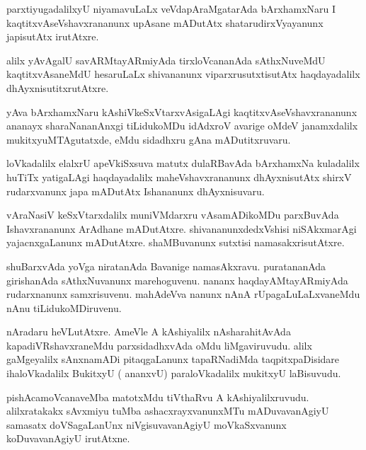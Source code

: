 \documentclass{article}
\begin{document}
\begin{mn}
parxtiyugadalilxyU niyamavuLaLx veVdapAraMgatarAda bArxhamxNaru I kaqtitxvAseVshavxrananunx 
upAsane mADutAtx shatarudirxVyayanunx japisutAtx irutAtxre.
\end{mn}

\begin{mn}
alilx yAvAgalU savARMtayARmiyAda tirxloVcananAda sAthxNuveMdU kaqtitxvAsaneMdU hesaruLaLx 
shivananunx viparxrusutxtisutAtx haqdayadalilx dhAyxnisutitxrutAtxre.
\end{mn}

\begin{mn}
yAva bArxhamxNaru kAshiVkeSxVtarxvAsigaLAgi kaqtitxvAseVshavxrananunx ananayx sharaNananAnxgi 
tiLidukoMDu idAdxroV avarige oMdeV janamxdalilx mukitxyuMTAgutatxde, eMdu sidadhxru gAna 
mADutitxruvaru.
\end{mn}

\begin{mn}
loVkadalilx elalxrU apeVkiSxsuva matutx dulaRBavAda bArxhamxNa kuladalilx huTiTx yatigaLAgi 
haqdayadalilx maheVshavxrananunx dhAyxnisutAtx shirxV rudarxvanunx japa mADutAtx Ishananunx 
dhAyxnisuvaru.
\end{mn}

\begin{mn}
vAraNasiV keSxVtarxdalilx muniVMdarxru vAsamADikoMDu parxBuvAda Ishavxrananunx ArAdhane mADutAtxre. 
shivananunxdedxVshisi niSAkxmarAgi yajacnxgaLanunx mADutAtxre. shaMBuvanunx sutxtisi 
namasakxrisutAtxre.
\end{mn}

\begin{mn}
shuBarxvAda yoVga niratanAda Bavanige  namasAkxravu. puratananAda girishanAda sAthxNuvanunx 
marehoguvenu. nananx  haqdayAMtayARmiyAda rudarxnanunx samxrisuvenu. mahAdeVva nanunx nAnA 
rUpagaLuLaLxvaneMdu nAnu tiLidukoMDiruvenu.
\end{mn}


\begin{mn}
nAradaru heVLutAtxre. AmeVle A kAshiyalilx nAsharahitAvAda kapadiVRshavxraneMdu parxsidadhxvAda 
oMdu liMgaviruvudu. alilx gaMgeyalilx sAnxnamADi pitaqgaLanunx tapaRNadiMda taqpitxpaDisidare 
ihaloVkadalilx BukitxyU ( ananxvU) paraloVkadalilx mukitxyU laBisuvudu.
\end{mn}

\begin{mn}
pishAcamoVcanaveMba matotxMdu tiVthaRvu A kAshiyalilxruvudu. alilxratakakx sAvxmiyu tuMba 
ashacxrayxvanunxMTu mADuvavanAgiyU samasatx doVSagaLanUnx niVgisuvavanAgiyU moVkaSxvanunx 
koDuvavanAgiyU irutAtxne.
\end{mn}
\end{document}
